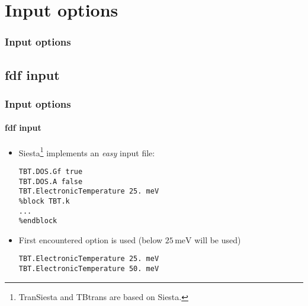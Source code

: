 
\section{Input options}

\begin{framenologo}
  \frametitle{Input options}
  \tableofcontents[currentsection]
\end{framenologo}


\subsection{fdf input}

\begin{frame}[fragile]
  \frametitle{Input options}
  \framesubtitle{fdf input}
  
  \begin{itemize}
    \item Siesta\footnote{TranSiesta and TBtrans are based on Siesta.} implements an
    \emph{easy} input file:
\begin{verbatim}
TBT.DOS.Gf true
TBT.DOS.A false
TBT.ElectronicTemperature 25. meV
%block TBT.k
...
%endblock
\end{verbatim}

    \item First encountered option is used (below $25\,\mathrm{meV}$ will be used)
\begin{verbatim}
TBT.ElectronicTemperature 25. meV
TBT.ElectronicTemperature 50. meV
\end{verbatim}
  \end{itemize}

  
\end{frame}

